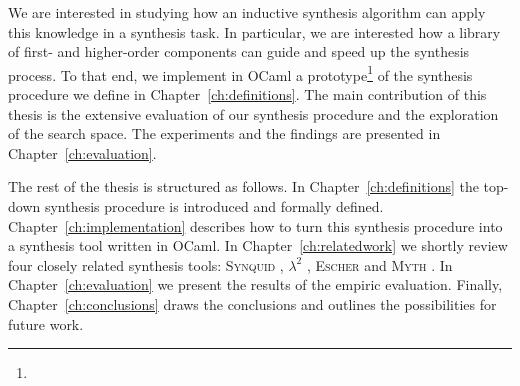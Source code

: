 We are interested in studying how an inductive synthesis algorithm can apply this knowledge in a synthesis task. In particular, we are interested how a library of first- and higher-order components can guide and speed up the synthesis process.
To that end, we implement in OCaml a prototype\footnote{} of the synthesis procedure we define in Chapter~\ref{ch:definitions}. The main contribution of this thesis is the extensive evaluation of our synthesis procedure and the exploration of the search space. The experiments and the findings are presented in Chapter~\ref{ch:evaluation}.

The rest of the thesis is structured as follows. In Chapter~\ref{ch:definitions} the top-down synthesis procedure is introduced and formally defined. Chapter~\ref{ch:implementation} describes how to turn this synthesis procedure into a synthesis tool written in OCaml. In Chapter~\ref{ch:relatedwork} we shortly review four closely related synthesis tools: \textsc{Synquid} \cite{SynquidPaper}, $\lambda^2$ \cite{LambdaSquarePaper}, \textsc{Escher} \cite{EscherPaper} and \textsc{Myth} \cite{MythPaper}. In Chapter~\ref{ch:evaluation} we present the results of the empiric evaluation. Finally, Chapter~\ref{ch:conclusions} draws the conclusions and outlines the possibilities for future work.
